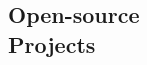 \documentclass[margin,line]{resume}
\begin{document}
\begin{resume}
\vspace{-3mm}





\section{\mysidestyle Open-source\\Projects}


\end{resume}
\end{document}
